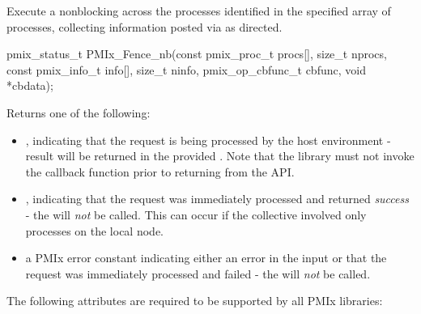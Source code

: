 \summary

Execute a nonblocking  across the processes identified in the specified array of processes, collecting information posted via  as directed.

\format

\cspecificstart
\begin{codepar}
pmix_status_t
PMIx_Fence_nb(const pmix_proc_t procs[], size_t nprocs,
              const pmix_info_t info[], size_t ninfo,
              pmix_op_cbfunc_t cbfunc, void *cbdata);
\end{codepar}
\cspecificend

\begin{arglist}
\end{arglist}

Returns one of the following:

\begin{itemize}
    \item {}, indicating that the request is being processed by the host environment - result will be returned in the provided . Note that the library must not invoke the callback function prior to returning from the \ac{API}.
    \item {}, indicating that the request was immediately processed and returned \textit{success} - the  will \textit{not} be called. This can occur if the collective involved only processes on the local node.
    \item a \ac{PMIx} error constant indicating either an error in the input or that the request was immediately processed and failed - the  will \textit{not} be called.
\end{itemize}


\reqattrstart
The following attributes are required to be supported by all \ac{PMIx} libraries:


\reqattrend

